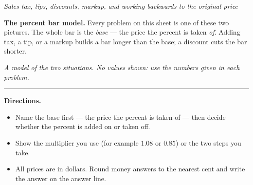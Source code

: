 \documentclass[12pt]{article}
\begin{document}

\begin{center}\small\textit{Sales tax, tips, discounts, markup, and working
backwards to the original price}\end{center}

\noindent\textbf{The percent bar model.} Every problem on this sheet is one of
these two pictures. The whole bar is the \emph{base} --- the price the percent is
taken \emph{of}. Adding tax, a tip, or a markup builds a bar longer than the
base; a discount cuts the bar shorter.

\begin{center}
\end{center}
\noindent\small\textit{A model of the two situations. No values shown: use the
numbers given in each problem.}\normalsize

\smallskip
\noindent\rule{\linewidth}{0.4pt}
\smallskip

\noindent\textbf{Directions.}
\begin{itemize}[itemsep=2pt]
  \item Name the base first --- the price the percent is taken of --- then decide
        whether the percent is added on or taken off.
  \item Show the multiplier you use (for example $1.08$ or $0.85$) or the two
        steps you take.
  \item All prices are in dollars. Round money answers to the nearest cent and
        write the answer on the answer line.
\end{itemize}
\end{document}
